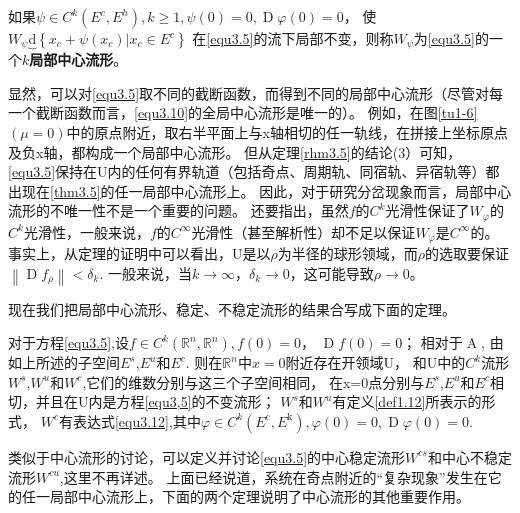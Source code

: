 \begin{defination}
	如果$\psi \in C ^ { k } \left( E ^ { c } , E ^ { h } \right) , k \geqslant 1 , \psi ( 0 ) = 0 , \operatorname{D} \varphi ( 0 ) = 0$，
	使
	$W_\psi \underbrace { \mathrm { d } }\left\{ x _ { c } + \psi \left( x _ { c } \right) | x _ {c } \in E ^ { c } \right\}$
	在\ref{equ3.5}的流下局部不变，则称\(W_\psi\)为\ref{equ3.5}的一个\(k\)\textbf{局部中心流形}。
\end{defination}


\begin{corollary}
	显然，可以对\ref{equ3.5}取不同的截断函数，而得到不同的局部中心流形（尽管对每一个截断函数而言，\ref{equ3.10}的全局中心流形是唯一的）。
	例如，在图\ref{tu1-6}$( \mu = 0 )$中的原点附近，取右半平面上与x轴相切的任一轨线，在拼接上坐标原点及负x轴，都构成一个局部中心流形。
	但从定理\ref{rhm3.5}的结论(3）可知，
	\ref{equ3.5}保持在U内的任何有界轨道（包括奇点、周期轨、同宿轨、异宿轨等）都出现在\ref{thm3.5}的任一局部中心流形上。
	因此，对于研究分岔现象而言，局部中心流形的不唯一性不是一个重要的问题。
	还要指出，虽然\(f\)的\(C^k\)光滑性保证了\(W_\varphi\)的\(C^k\)光滑性，一般来说，\(f\)的\(C^\infty\)光滑性（甚至解析性）却不足以保证\(W_\varphi\)是\(C^\infty\)的。
	事实上，从定理的证明中可以看出，U是以\(\rho\)为半径的球形领域，而\(\rho\)的选取要保证$\left\| \operatorname { D } f _ { \rho } \right\| < \delta _ { k }$.
	一般来说，当$k \rightarrow \infty$，$\delta _ { k } \rightarrow 0$，这可能导致$\rho\rightarrow 0$。
	
	现在我们把局部中心流形、稳定、不稳定流形的结果合写成下面的定理。
\end{corollary}

\begin{theorem}
	对于方程\ref{equ3.5},设$f \in C ^ { k } \left( \mathbb { R } ^ { n } , \mathbb { R } ^ { n } \right) , f ( 0 ) = 0$，
	$\operatorname{D}f ( 0 ) = 0$；
	相对于\(\operatorname{A}\),
	由如上所述的子空间\(E^s\),\(E^u\)和\(E^c\).
	则在\(\mathbb{R}^n\)中\(x=0\)附近存在开领域U，
	和U中的\(C^k\)流形
	\(W^s\),\(W^u\)和\(W^c\),它们的维数分别与这三个子空间相同，
	在x=0点分别与\(E^s\),\(E^u\)和\(E^c\)相切，并且在U内是方程\ref{equ3,5}的不变流形；
	\(W^s\)和\(W^u\)有定义\ref{def1.12}所表示的形式，
	\(W^c\)有表达式\ref{equ3.12},其中$\varphi \in C ^ { k } \left( E ^ { \mathrm { c } } , E ^ { \mathrm{k} } \right) , \varphi ( 0 )= 0 , \operatorname{D} \varphi ( 0 ) = 0$.
\end{theorem}

类似于中心流形的讨论，可以定义并讨论\ref{equ3.5}的中心稳定流形\(W^{cs}\)和中心不稳定流形\(W^{cu}\),这里不再详述。
上面已经说道，系统在奇点附近的“复杂现象”发生在它的任一局部中心流形上，下面的两个定理说明了中心流形的其他重要作用。

